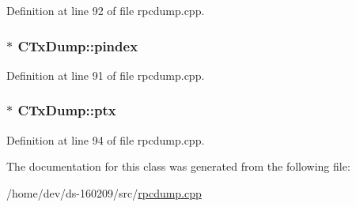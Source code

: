Definition at line 92 of file rpcdump.\+cpp.

\hypertarget{class_c_tx_dump_a98da78bae1b040ff7e8f33cd7a91ccd0}{}
\subsubsection[{pindex}]{$\ast$ C\+Tx\+Dump\+::pindex}\label{class_c_tx_dump_a98da78bae1b040ff7e8f33cd7a91ccd0}


Definition at line 91 of file rpcdump.\+cpp.

\hypertarget{class_c_tx_dump_a35bc70e8a048c6a5c7d7d75007d23d24}{}
\subsubsection[{ptx}]{$\ast$ C\+Tx\+Dump\+::ptx}\label{class_c_tx_dump_a35bc70e8a048c6a5c7d7d75007d23d24}


Definition at line 94 of file rpcdump.\+cpp.



The documentation for this class was generated from the following file\+:\begin{DoxyCompactItemize}
\item 
/home/dev/ds-\/160209/src/\hyperlink{rpcdump_8cpp}{rpcdump.\+cpp}\end{DoxyCompactItemize}
